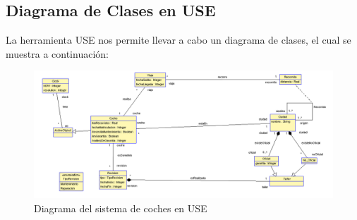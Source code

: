 \documentclass[12pt.a4paper]{article}
\begin{document}
\subsection{Diagrama de Clases en USE}
La herramienta USE nos permite llevar a cabo un diagrama de clases, el cual se muestra a continuación:
\begin{figure}[H]
     \includegraphics[width=1\linewidth]{diagramas/DiagramaUSE_apartadoA.png}
     \caption{Diagrama del sistema de coches en USE}
     \label{Diagrama del sistema de coches en USE}
\end{figure}
\vspace{1.0cm}
\end{document}
